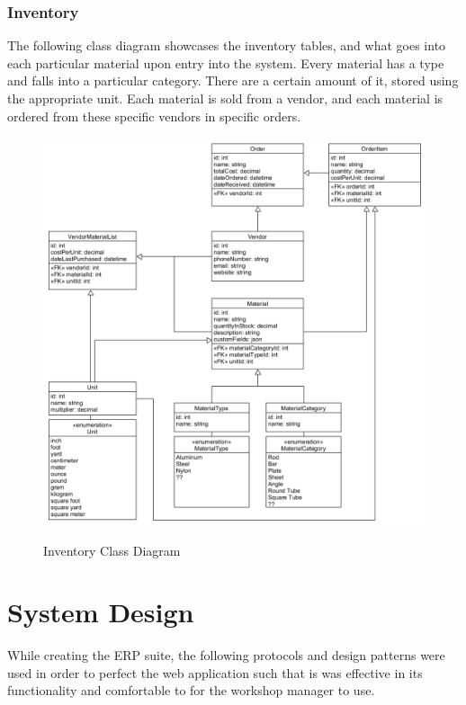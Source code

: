 {{{{{{{{\subsubsection{Inventory}
The following class diagram showcases the inventory tables, and what goes into each particular material upon entry into the system. Every material has a type and falls into a particular category. There are a certain amount of it, stored using the appropriate unit. Each material is sold from a vendor, and each material is ordered from these specific vendors in specific orders. 
\begin{figure}[H]
	\centering
	\includegraphics[width=5in]{Inventory.png}\\
	\caption{Inventory Class Diagram}
	\label{fig:tobias}
\end{figure}
\newpage

\section{System Design}
While creating the ERP suite, the following protocols and design patterns were used in order to perfect the web application such that is was effective in its functionality and comfortable to for the workshop manager to use. 

}}}}}}}}
